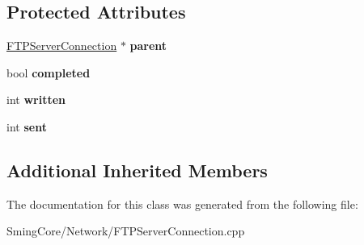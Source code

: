 \subsection*{Protected Attributes}
\begin{DoxyCompactItemize}
\item 
\hypertarget{class_f_t_p_data_stream_a6db9ff53eb8823e1e00892cd5da9fbd4}{}\hyperlink{class_f_t_p_server_connection}{F\+T\+P\+Server\+Connection} $\ast$ {\bfseries parent}\label{class_f_t_p_data_stream_a6db9ff53eb8823e1e00892cd5da9fbd4}

\item 
\hypertarget{class_f_t_p_data_stream_aad73d06e1fb6b7191a7bff8e28c6f216}{}bool {\bfseries completed}\label{class_f_t_p_data_stream_aad73d06e1fb6b7191a7bff8e28c6f216}

\item 
\hypertarget{class_f_t_p_data_stream_a0cd2d52a8205a08bb3a5aadc634c3254}{}int {\bfseries written}\label{class_f_t_p_data_stream_a0cd2d52a8205a08bb3a5aadc634c3254}

\item 
\hypertarget{class_f_t_p_data_stream_a16f4c6b5fa1bce3a838a88858dd36b2f}{}int {\bfseries sent}\label{class_f_t_p_data_stream_a16f4c6b5fa1bce3a838a88858dd36b2f}

\end{DoxyCompactItemize}
\subsection*{Additional Inherited Members}


The documentation for this class was generated from the following file\+:\begin{DoxyCompactItemize}
\item 
Sming\+Core/\+Network/F\+T\+P\+Server\+Connection.\+cpp\end{DoxyCompactItemize}
